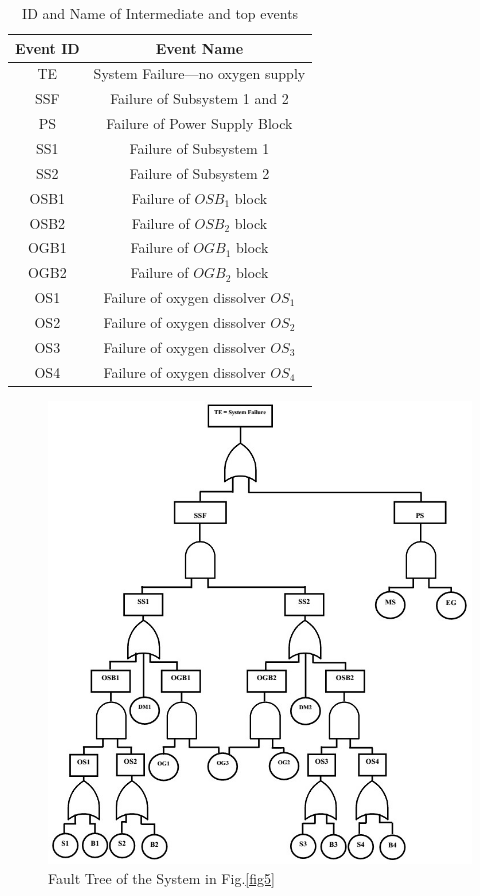 \documentclass[10pt]{llncs}
\begin{document}
\begin{table}[thpb]
\renewcommand{\arraystretch}{1.3}
\caption{ID and Name of Intermediate and top events}
\label{table2}
\centering
\begin{tabular}{c c}
\hline
\bfseries Event ID & \bfseries Event Name\\
\hline
TE & System Failure---no oxygen supply\\
SSF & Failure of Subsystem 1 and 2\\
PS & Failure of Power Supply Block\\
SS1 & Failure of Subsystem 1\\
SS2 & Failure of Subsystem 2\\
OSB1 & Failure of ${OSB}_1$ block\\
OSB2 & Failure of ${OSB}_2$ block\\
OGB1 & Failure of ${OGB}_1$ block\\
OGB2& Failure of ${OGB}_2$ block\\
OS1 & Failure of oxygen dissolver $OS_1$ \\
OS2 & Failure of oxygen dissolver $OS_2$\\
OS3 & Failure of oxygen dissolver $OS_3$\\
OS4 & Failure of oxygen dissolver $OS_4$\\
\hline
\end{tabular}
\end{table}

\begin{figure}[thpb]
\centering
\includegraphics[scale=.40]{FTA_main}
\caption{Fault Tree of the System in Fig.\ref{fig5} }
\label{fig6}       %
\end{figure} 
\end{document}
